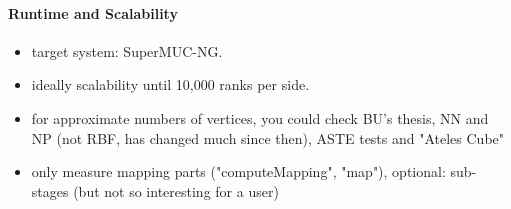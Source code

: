 \paragraph{Runtime and Scalability}

\begin{itemize}
  \item target system: SuperMUC-NG.
  \item ideally scalability until 10,000 ranks per side.
  \item for approximate numbers of vertices, you could check BU's thesis, NN and NP (not RBF, has changed much since then), ASTE tests and "Ateles Cube"
  \item only measure mapping parts ("computeMapping", "map"), optional: sub-stages (but not so interesting for a user)
\end{itemize}
